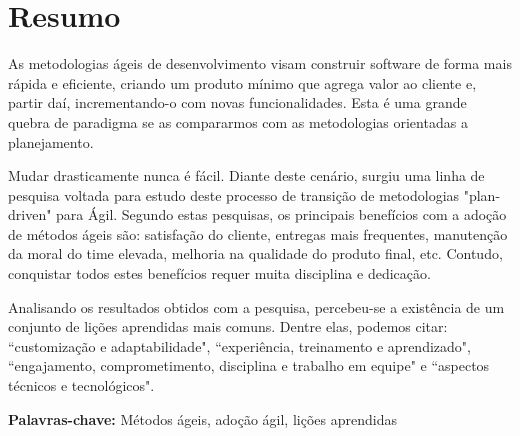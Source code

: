 \chapter*{Resumo}

As metodologias ágeis de desenvolvimento visam construir software de forma mais rápida e eficiente, criando um produto mínimo que agrega valor ao cliente e, partir daí, incrementando-o com novas funcionalidades. Esta é uma grande quebra de paradigma se as compararmos com as metodologias orientadas a planejamento.

Mudar drasticamente nunca é fácil. Diante deste cenário, surgiu uma linha de pesquisa voltada para estudo deste processo de transição de metodologias "plan-driven" para Ágil. Segundo estas pesquisas, os principais benefícios com a adoção de métodos ágeis são: satisfação do cliente, entregas mais frequentes, manutenção da moral do time elevada, melhoria na qualidade do produto final, etc. Contudo, conquistar todos estes benefícios requer muita disciplina e dedicação.

Analisando os resultados obtidos com a pesquisa, percebeu-se a existência de um conjunto de lições aprendidas mais comuns. Dentre elas, podemos citar: ``customização e adaptabilidade", ``experiência, treinamento e aprendizado", ``engajamento, comprometimento, disciplina e trabalho em equipe" e ``aspectos técnicos e tecnológicos".

\textbf{Palavras-chave:} Métodos ágeis, adoção ágil, lições aprendidas

